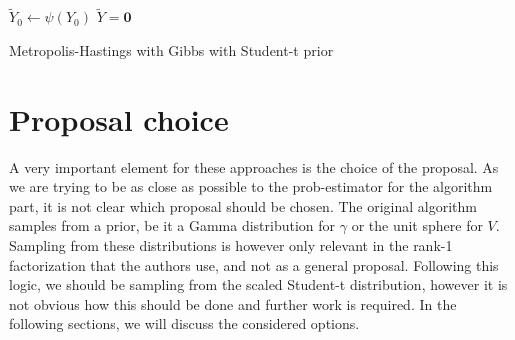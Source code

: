 \documentclass[12pt]{memoir}
\newcommand{\mb}{\mathbf}
\begin{document}
\begin{algorithm}[H]
    \DontPrintSemicolon

    $\tilde Y_0 \gets \psi(Y_0)$\;
    $\tilde Y = \mb 0$\;
    \caption{Metropolis-Hastings with Gibbs with Student-t prior}
\end{algorithm}\medbreak

\section{Proposal choice}\label{section:proposal-choice}
A very important element for these approaches is the choice of the proposal. As we are trying to be as close as possible to the prob-estimator for the algorithm part, it is not clear which proposal should be chosen. The original algorithm samples from a prior, be it a Gamma distribution for $\gamma$ or the unit sphere for $V$. Sampling from these distributions is however only relevant in the rank-1 factorization that the authors use, and not as a general proposal. Following this logic, we should be sampling from the scaled Student-t distribution, however it is not obvious how this should be done and further work is required. In the following sections, we will discuss the considered options.
\end{document}
